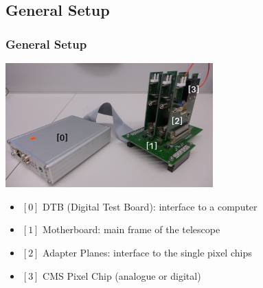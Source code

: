 \documentclass[9pt]{beamer}
\begin{document}
\subsection{General Setup}
\begin{frame}
	\frametitle{General Setup}
	\begin{center}
		\includegraphics[width=8cm]{Pics/setup}
	\end{center}
	\begin{itemize}
		\item $[0]$ DTB (Digital Test Board): interface to a computer
		\item $[1]$ Motherboard: main frame of the telescope
		\item $[2]$ Adapter Planes: interface to the single pixel chips
		\item $[3]$ CMS Pixel Chip (analogue or digital)
	\end{itemize}
\end{frame}
\end{document}
